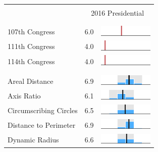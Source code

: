 
\begin{table}
\renewcommand{\arraystretch}{0.7}
 \begin{tabular}{l rm{7em}}
\hline \hline \\

{} & \multicolumn{2}{c}{2016 Presidential} \\

\\ \hline \\
107th Congress         &   6.0 &          \includegraphics[width=7em]{mini_hist/VA_2016_107} \\
111th Congress         &   4.0 &          \includegraphics[width=7em]{mini_hist/VA_2016_111} \\
114th Congress         &   4.0 &          \includegraphics[width=7em]{mini_hist/VA_2016_114} \\
\\ \hline \\ 
Areal Distance         &   6.9 &       \includegraphics[width=7em]{mini_hist/VA_2016_dist_a} \\
Axis Ratio             &   6.1 &   \includegraphics[width=7em]{mini_hist/VA_2016_axis_ratio} \\
Circumscribing Circles &   6.5 &        \includegraphics[width=7em]{mini_hist/VA_2016_reock} \\
Distance to Perimeter  &   6.9 &     \includegraphics[width=7em]{mini_hist/VA_2016_rohrbach} \\
Dynamic Radius         &   6.6 &   \includegraphics[width=7em]{mini_hist/VA_2016_dyn_radius} \\

\end{tabular}
\end{table}

